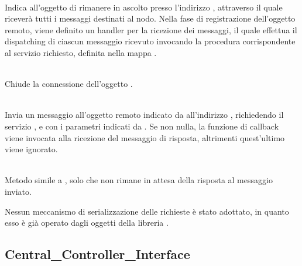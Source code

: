 	\begin{description}
		\item {} \\
		Indica all'oggetto  di rimanere in ascolto presso l'indirizzo , attraverso il quale riceverà tutti i messaggi destinati al nodo. Nella fase di registrazione dell'oggetto remoto, viene definito un handler per la ricezione dei messaggi, il quale effettua il dispatching di ciascun messaggio ricevuto invocando la procedura corrispondente al servizio richiesto, definita nella mappa .
		
		\item {} \\
		Chiude la connessione dell'oggetto .
		
		\item {}\\
		Invia un messaggio all'oggetto remoto indicato da  all'indirizzo , richiedendo il servizio , e con i parametri indicati da . Se non nulla, la funzione di callback  viene invocata alla ricezione del messaggio di risposta, altrimenti quest'ultimo viene ignorato.
		
		\item {}\\
		Metodo simile a , solo che non rimane in attesa della risposta al messaggio inviato.
	\end{description}
	
	Nessun meccanismo di serializzazione delle richieste è stato adottato, in quanto esso è già operato dagli oggetti della libreria .
	
	\subsection{Central\_Controller\_Interface}
	
